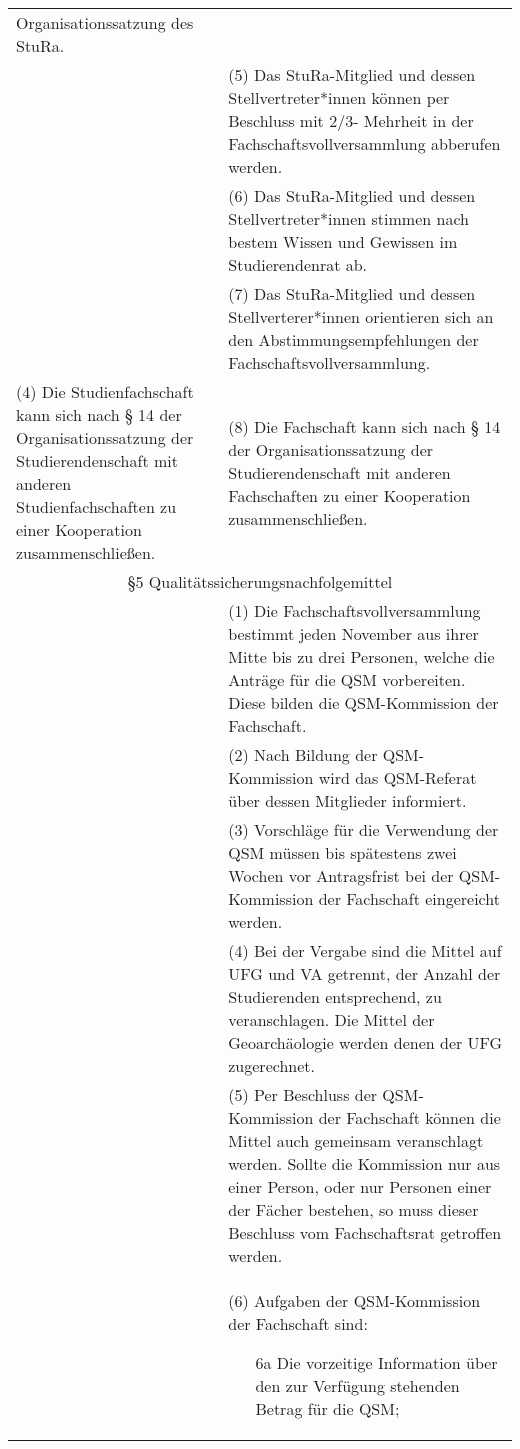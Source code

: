 {\begin{longtable}{|p{7.5cm}|p{7.5cm}|}
        Organisationssatzung des StuRa. \\
        &(5) Das StuRa-Mitglied und dessen Stellvertreter*innen können per Beschluss mit 2/3-
        Mehrheit in der Fachschaftsvollversammlung abberufen werden. \\
        &(6) Das StuRa-Mitglied und dessen Stellvertreter*innen stimmen nach bestem Wissen und
        Gewissen im Studierendenrat ab. \\
        &(7) Das StuRa-Mitglied und dessen Stellverterer*innen orientieren sich an den
        Abstimmungsempfehlungen der Fachschaftsvollversammlung. \\
        (4)  Die Studienfachschaft kann sich nach § 14 der Organisationssatzung der
        Studierendenschaft mit anderen Studienfachschaften zu einer Kooperation
        zusammenschließen.&
        (8)  Die Fachschaft kann sich nach § 14 der Organisationssatzung der
        Studierendenschaft mit anderen Fachschaften zu einer Kooperation zusammenschließen.\\
        \multicolumn{2}{|c|}{§5 Qualitätssicherungsnachfolgemittel}\\\hline
        &(1) Die Fachschaftsvollversammlung bestimmt jeden November aus ihrer Mitte bis zu
        drei Personen, welche die Anträge für die QSM vorbereiten. Diese bilden die
        QSM-Kommission der Fachschaft.\\
        &(2) Nach Bildung der QSM-Kommission wird das QSM-Referat über dessen Mitglieder
        informiert. \\
        &(3) Vorschläge für die Verwendung der QSM müssen bis spätestens zwei Wochen vor
        Antragsfrist bei der QSM-Kommission der Fachschaft eingereicht werden.\\
        &(4) Bei der Vergabe sind die Mittel auf UFG und VA getrennt, der Anzahl der
        Studierenden entsprechend, zu veranschlagen. Die Mittel der Geoarchäologie werden
        denen der UFG zugerechnet. \\
        &(5) Per Beschluss der QSM-Kommission der Fachschaft können die Mittel auch gemeinsam
        veranschlagt werden. Sollte die Kommission nur aus einer Person, oder nur Personen
        einer der Fächer bestehen, so muss dieser Beschluss vom Fachschaftsrat getroffen
        werden. \\
        &(6) Aufgaben der QSM-Kommission der Fachschaft sind: 
        \begin{itemize}
        \item[6a] Die vorzeitige Information über den zur Verfügung stehenden Betrag für die QSM;

\end{itemize}
\end{longtable}}
